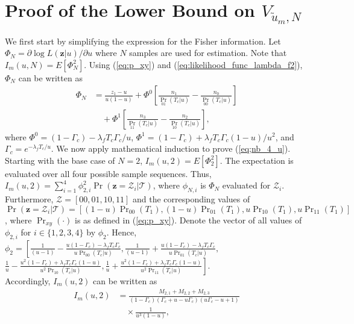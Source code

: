 \documentclass[11pt,draftclsnofoot,journal,onecolumn]{IEEEtran}
\begin{document}
\section{Proof of the Lower Bound on $V_{\tilde{u}_m,N}$}
\label{sec:math_ind_u}

\begin{IEEEproof} We first start by simplifying the expression for the Fisher information. Let $\Phi_N = \partial \log L(\boldsymbol{z}|u)/\partial u$ where $N$ samples are used for estimation. Note that $I_m\left(u,N\right) = E\left[\Phi_N^2\right]$. Using (\ref{eq:p_xy}) and (\ref{eq:likelihood_func_lambda_f2}), $\Phi_N$ can be written as
\begin{align}
\Phi_N & = \frac{z_1-u}{u(1-u)} + \Phi^0 \left[\frac{n_1}{\Pr_{01}(T_c|u)}-\frac{n_0}{\Pr_{00}(T_c|u)}\right]\nonumber\\&\quad + \Phi^1 \left[\frac{n_3}{\Pr_{11}(T_c|u)}-\frac{n_2}{\Pr_{10}(T_c|u)}\right],
\label{eq:derv_u_ML_1}
\end{align}
where $\Phi^0 = \left(1-\Gamma_c\right)-\lambda_f T_c \Gamma_c/u$, $\Phi^1 = \left(1-\Gamma_c\right)+\lambda_f T_c \Gamma_c \left(1-u\right)/u^2$, and $\Gamma_c = e^{-\lambda_f T_c/u}$. We now apply mathematical induction to prove (\ref{eq;nb_4_u}). Starting with the base case of $N = 2$, $I_m\left(u,2\right) = E\left[\Phi_2^2\right]$. The expectation is evaluated over all four possible sample sequences. Thus, $I_m\left(u,2\right) = \sum_{i=1}^{4} \phi_{2,i}^2 \Pr(\boldsymbol{z} = \mathcal{Z}_i|\mathcal{T})$, where $\phi_{N,i}$ is $\Phi_N$ evaluated for $\mathcal{Z}_i$. Furthermore, $\mathcal{Z} = [00,01,10,11]$ and the corresponding values of $\Pr(\boldsymbol{z} = \mathcal{Z}_i|\mathcal{T}) = [(1-u)\Pr_{00}(T_1), (1-u)\Pr_{01}(T_1), u\Pr_{10}(T_1), u\Pr_{11}(T_1)]$, where $\Pr_{xy}(\cdot)$ is as defined in (\ref{eq:p_xy}). Denote the vector of all values of $\phi_{2,i}$ for $i \in \{1,2,3,4\}$ by $\phi_{2}$. Hence, $\phi_{2} = \left[ \frac{1}{(u-1)} - \frac{u\left(1-\Gamma_c\right)-\lambda_f T_c \Gamma_c}{u\Pr_{00}(T_c|u)}, \frac{1}{(u-1)} + \frac{u\left(1-\Gamma_c\right)-\lambda_f T_c \Gamma_c}{u\Pr_{01}(T_c|u)},\right.$ $\left.\frac{1}{u} - \frac{u^2\left(1-\Gamma_c\right)+\lambda_f T_c \Gamma_c \left(1-u\right)}{u^2\Pr_{10}(T_c|u)},\frac{1}{u} + \frac{u^2\left(1-\Gamma_c\right)+\lambda_f T_c \Gamma_c \left(1-u\right)}{u^2\Pr_{11}(T_c|u)}\right]$. \\Accordingly, $I_m\left(u,2\right)$ can be written as
\begin{align}
I_m\left(u,2\right) & = \frac{M_{2,1}+M_{2,2}+M_{2,3}}{(1 - \Gamma_c)(\Gamma_c + u - u\Gamma_c)(u\Gamma_c - u + 1)}\nonumber\\&\quad\times\frac{1}{u^3(1-u)},

\end{align}
\end{IEEEproof}
\end{document}
